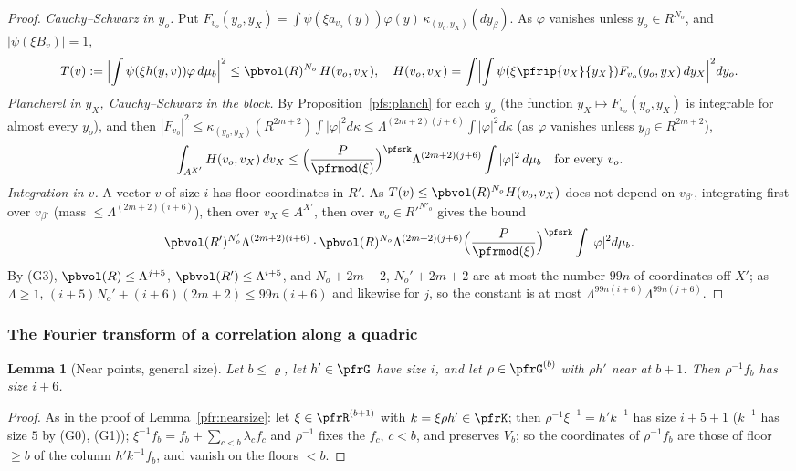 \documentclass[10pt]{amsart}
\newtheorem{lemma}[theorem]{Lemma}
\theoremstyle{definition}
\theoremstyle{remark}
\begin{document}
\begin{proof}
\emph{Cauchy--Schwarz in $y_o$.} Put $F_{v_o}(y_o,y_X)=\int\psi(\xi a_{v_o}(y))\varphi(y)\,\kappa_{(y_o,y_X)}(dy_\beta)$.
As $\varphi$ vanishes unless $y_o\in R^{N_o}$, and $|\psi(\xi B_v)|=1$,
\[
T(v):=\Bigl|\int\psi(\xi h(y,v))\varphi\,d\mu_b\Bigr|^2\le\pbvol(R)^{N_o}\,H(v_o,v_X),\quad
H(v_o,v_X)=\int\Bigl|\int\psi(\xi\pfrip{v_X}{y_X})F_{v_o}(y_o,y_X)\,dy_X\Bigr|^2dy_o .
\]
\emph{Plancherel in $y_X$, Cauchy--Schwarz in the block.} By Proposition~\ref{pfs:planch} for each $y_o$ (the
function $y_X\mapsto F_{v_o}(y_o,y_X)$ is integrable for almost every $y_o$), and then
$|F_{v_o}|^2\le\kappa_{(y_o,y_X)}(R^{2m+2})\int|\varphi|^2d\kappa\le\Lambda^{(2m+2)(j+6)}\int|\varphi|^2d\kappa$ (as
$\varphi$ vanishes unless $y_\beta\in R^{2m+2}$),
\[
\int_{A^{X'}}H(v_o,v_X)\,dv_X\le\Bigl(\frac P{\pfrmod(\xi)}\Bigr)^{\pfsrk}\Lambda^{(2m+2)(j+6)}\int|\varphi|^2\,d\mu_b
\quad\text{for every }v_o .
\]
\emph{Integration in $v$.} A vector $v$ of size $i$ has floor coordinates in $R'$. As $T(v)\le\pbvol(R)^{N_o}H(v_o,v_X)$
does not depend on $v_{\beta'}$, integrating first over $v_{\beta'}$ (mass $\le\Lambda^{(2m+2)(i+6)}$), then over
$v_X\in A^{X'}$, then over $v_o\in R'^{N'_o}$ gives the bound
\[
\pbvol(R')^{N'_o}\Lambda^{(2m+2)(i+6)}\cdot\pbvol(R)^{N_o}\Lambda^{(2m+2)(j+6)}\Bigl(\frac P{\pfrmod(\xi)}\Bigr)^{\pfsrk}\int|\varphi|^2d\mu_b .
\]
By (G3), $\pbvol(R)\le\Lambda^{j+5}$, $\pbvol(R')\le\Lambda^{i+5}$, and $N_o+2m+2$, $N_o'+2m+2$ are at most the number
$99n$ of coordinates off $X'$; as $\Lambda\ge1$, $(i+5)N_o'+(i+6)(2m+2)\le99n(i+6)$ and likewise for $j$, so the
constant is at most $\Lambda^{99n(i+6)}\Lambda^{99n(j+6)}$.
\end{proof}

\subsubsection*{The Fourier transform of a correlation along a quadric}
\begin{lemma}[Near points, general size]\label{pfs:nearsize}
Let $b\le\varrho$, let $h'\in\pfrG$ have size $i$, and let $\rho\in\pfrG^{(b)}$ with $\rho h'$ near at $b+1$. Then
$\rho^{-1}f_b$ has size $i+6$.
\end{lemma}
\begin{proof}
As in the proof of Lemma~\ref{pfr:nearsize}: let $\xi\in\pfrR^{(b+1)}$ with $k=\xi\rho h'\in\pfrK$; then
$\rho^{-1}\xi^{-1}=h'k^{-1}$ has size $i+5+1$ ($k^{-1}$ has size $5$ by (G0), (G1)); $\xi^{-1}f_b=f_b+\sum_{c<b}\lambda_cf_c$
and $\rho^{-1}$ fixes the $f_c$, $c<b$, and preserves $V_b$; so the coordinates of $\rho^{-1}f_b$ are those of
floor $\ge b$ of the column $h'k^{-1}f_b$, and vanish on the floors $<b$.
\end{proof}
\end{document}
